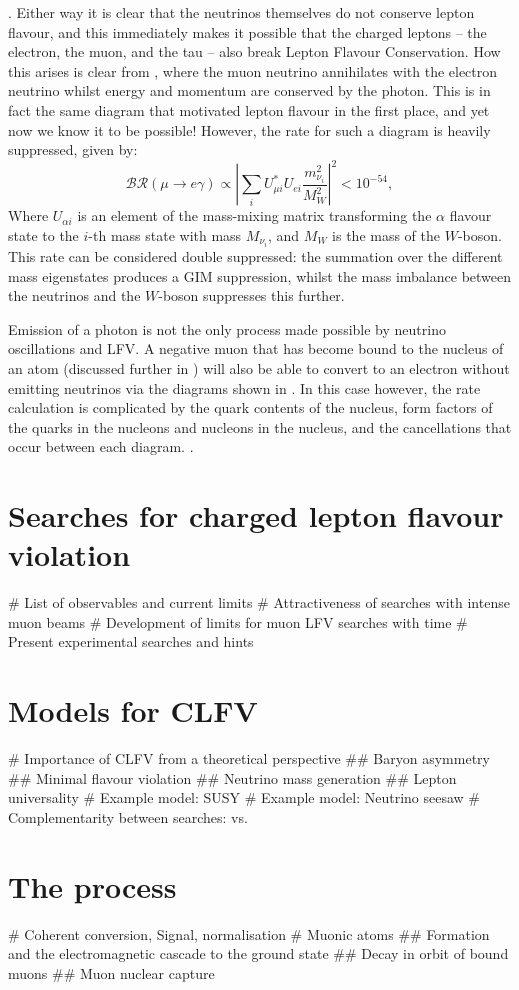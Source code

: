 .
Either way it is clear that the neutrinos themselves do not conserve lepton flavour, and this immediately makes it possible that the charged leptons -- the electron, the muon, and the tau -- also break Lepton Flavour Conservation.
How this arises is clear from , where the muon neutrino annihilates with the electron neutrino whilst energy and momentum are conserved by the photon.
This is in fact the same diagram that motivated lepton flavour in the first place, and yet now we know it to be possible!
However, the rate for such a diagram is heavily suppressed, given by:
\begin{equation}
\mathcal{BR}(\mu\rightarrow{}e\gamma)\propto\left|\sum_iU^*_{\mu i}U_{ei} \frac{m^2_{\nu_i}}{M^2_W}\right|^2 < 10^{-54},
\end{equation}
Where $U_{\alpha i}$ is an element of the mass-mixing matrix transforming the $\alpha$ flavour state to the $i$-th mass state with mass $M_{\nu_i}$, and $M_W$ is the mass of the $W$-boson.
This rate can be considered double suppressed: the summation over the different mass eigenstates produces a GIM suppression, whilst the mass imbalance between the neutrinos and the $W$-boson suppresses this further.

Emission of a photon is not the only process made possible by neutrino oscillations and \ac{LFV}.
A negative muon that has become bound to the nucleus of an atom (discussed further in ) will also be able to convert to an electron without emitting neutrinos via the diagrams
shown in .  
In this case however, the rate calculation is complicated by the quark contents of the nucleus, form factors of the quarks in the nucleons and nucleons in the nucleus, and the cancellations that occur between each diagram.
.

\section{Searches for charged lepton flavour violation}
\begin{easylist}
   # List of observables and current limits
   # Attractiveness of searches with intense muon beams
   # Development of limits for muon LFV searches with time
   # Present experimental searches and hints
\end{easylist}

\section{Models for CLFV}
\begin{easylist}
    # Importance of CLFV from a theoretical perspective
    ## Baryon asymmetry
    ## Minimal flavour violation
    ## Neutrino mass generation
    ## Lepton universality
    # Example model: SUSY
    # Example model: Neutrino seesaw
    # Complementarity between searches: \mueconv vs. \muegamma
\end{easylist}
\section{The \mueconv process}
\begin{easylist}
  # Coherent conversion, Signal, normalisation
  # Muonic atoms
  ## Formation and the electromagnetic cascade to the ground state
  ## Decay in orbit of bound muons
  ## Muon nuclear capture
\end{easylist}
